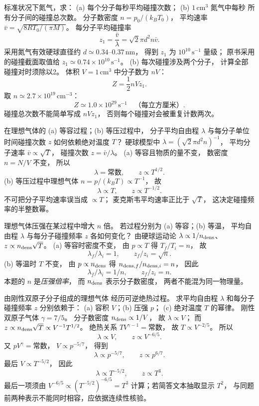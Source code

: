 标准状况下氮气，求：
(a) 每个分子每秒平均碰撞次数；
(b) $1\,\mathrm{cm^3}$ 氮气中每秒
所有分子间的碰撞总次数。
\exsolution
分子数密度
$n=p_0/(k_BT_0)$，
平均速率
$\bar v=\sqrt{8RT_0/(\pi M)}$。
每分子平均碰撞率
\[
\boxed{z_1=\frac{\bar v}{\lambda}
=\sqrt2\pi d^2 n\bar v}.
\]
采用氮气有效硬球直径约
$d\simeq0.34$--$0.37\,\mathrm{nm}$，
得到
$z_1$ 为
$10^{10}\,\mathrm{s^{-1}}$ 量级；
原书采用的碰撞截面取值给
$\boxed{z_1\simeq0.74\times10^{10}\,\mathrm{s^{-1}}}$。
(b) 每次碰撞涉及两个分子，
计算全部碰撞对时须除以2。
体积 $V=1\,\mathrm{cm^3}$ 中分子数为 $nV$：
\[
\boxed{Z=\frac12nVz_1}.
\]
取 $n\simeq2.7\times10^{19}\,\mathrm{cm^{-3}}$：
\[
\boxed{Z\simeq1.0\times10^{29}\,
\mathrm{s^{-1}}}
\quad\text{（每立方厘米）}.
\]
\excheck 碰撞总次数不能简单写成 $nVz_1$，
否则每个碰撞对会被重复计数两次。

在理想气体的
(a) 等容过程；(b) 等压过程中，
分子平均自由程 $\lambda$
与每分子单位时间碰撞次数 $z$
如何依赖绝对温度 $T$？
\exsolution
硬球模型中
$\lambda=(\sqrt2\pi d^2n)^{-1}$，
平均分子速率 $\bar v\propto\sqrt T$，
碰撞次数
$z=\bar v/\lambda$。
(a) 等容且物质的量不变，
数密度 $n=N/V$ 不变，
所以
\[
\boxed{\lambda=\text{常数},\qquad z\propto T^{1/2}}.
\]
(b) 等压过程中理想气体
$n=p/(k_BT)\propto T^{-1}$，
故
\[
\boxed{\lambda\propto T,\qquad z\propto T^{-1/2}}.
\]
\excheck 不可把分子平均速率误当成 $\propto T$；
麦克斯韦平均速率正比于 $\sqrt T$，
这决定碰撞频率的半整数幂。

理想气体压强在某过程中增大 $n$ 倍。
若过程分别为
(a) 等容；(b) 等温，
平均自由程 $\lambda$ 与每分子碰撞频率 $z$
各如何变化？
\exsolution
由硬球运动论
$\lambda\propto1/n_{\rm dens}$、
$z\propto n_{\rm dens}\sqrt T$。
(a) 等容时密度不变，
由 $p\propto T$ 得
$T_f/T_i=n$，
故
\[
\boxed{\lambda_f/\lambda_i=1,\qquad
z_f/z_i=\sqrt n}.
\]
(b) 等温时 $T$ 不变，
由 $p\propto n_{\rm dens}$ 得
$n_{{\rm dens},f}/n_{{\rm dens},i}=n$，
因此
\[
\boxed{\lambda_f/\lambda_i=1/n,\qquad
z_f/z_i=n}.
\]
\excheck 本题的 $n$ 是\emph{压强倍率}，
而 $n_{\rm dens}$ 表示分子数密度，
两者不能混为同一物理量。

由刚性双原子分子组成的理想气体
经历可逆绝热过程。
求平均自由程 $\lambda$
和每分子碰撞频率 $z$ 分别依赖于：
(a) 容积 $V$；(b) 压强 $p$；
(c) 绝对温度 $T$ 的幂律。
\exsolution
刚性双原子气体
$\gamma=7/5$。
分子数密度 $n_{\rm dens}\propto1/V$，
故 $\lambda\propto V$；
而
$z\propto n_{\rm dens}\sqrt T
\propto V^{-1}T^{1/2}$。
绝热关系
$TV^{\gamma-1}=\text{常数}$，
故 $T\propto V^{-2/5}$。
所以
\[
\boxed{\lambda\propto V,\qquad
z\propto V^{-6/5}}.
\]
又
$pV^\gamma=\text{常数}$，
$V\propto p^{-5/7}$，
得到
\[
\boxed{\lambda\propto p^{-5/7},\qquad
z\propto p^{6/7}}.
\]
最后
$V\propto T^{-5/2}$，
因此
\[
\boxed{\lambda\propto T^{-5/2},\qquad
z\propto T^{3}}.
\]
\excheck 最后一项须由
$V^{-6/5}\propto(T^{-5/2})^{-6/5}=T^3$
计算；若简答文本抽取显示 $T^2$，
与同题前两种表示不能同时相容，应依据连续性核验。

